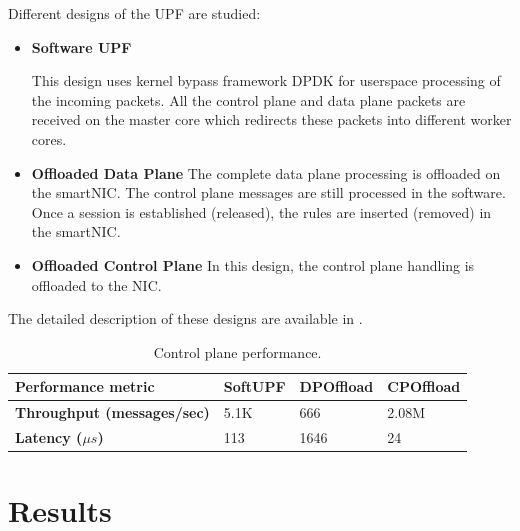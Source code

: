 Different designs of the UPF are studied:

\begin{itemize}
	\item \textbf{Software UPF}

	This design uses kernel bypass framework DPDK for userspace processing of the incoming packets. All the control plane and data plane packets are received on the master core which redirects these packets into different worker cores.
	\item \textbf{Offloaded Data Plane}
	The complete data plane processing is offloaded on the smartNIC. The control plane messages are still processed in the software. Once a session is established (released), the rules are inserted (removed) in the smartNIC.
	
	\item \textbf{Offloaded Control Plane}
	In this design, the control plane handling is offloaded to the NIC. 
\end{itemize}
The detailed description of these designs are available in \cite{}.
\begin{table}[htbp]
\begin{scriptsize}
\begin{center}
\def\arraystretch{1.5}%
\begin{tabular}{|p{3cm}|p{2cm}|p{2cm}|p{2cm}|}\hline 
{\bf{Performance metric}} & {\bf{SoftUPF}} & {\bf{DPOffload}} & {\bf{CPOffload}} \\ \hline 
{\bf{Throughput (messages/sec)}} & 5.1K  & 666  & 2.08M  \\ \hline
{\bf{Latency ($\mu s$)}} & 113  & 1646  & 24 \\ \hline
\end{tabular}
\caption{Control plane performance.} 
\label{tab:perf-cp-offload}
\end{center}
\end{scriptsize}
\end{table}

\section{Results}
